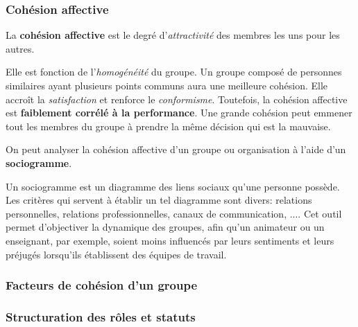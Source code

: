 \documentclass[12pt]{article}
\begin{document}
				
		\subsubsection{Cohésion affective}
		
		La \textbf{cohésion affective} est le degré d'\textit{attractivité} des membres les uns pour les autres.	\newline
		
		Elle est fonction de l'\textit{homogénéité} du groupe. Un groupe composé de personnes similaires ayant plusieurs points communs aura une meilleure cohésion. Elle accroît la \textit{satisfaction} et renforce le \textit{conformisme}. Toutefois, la cohésion affective est \textbf{faiblement corrélé à la performance}. Une grande cohésion peut emmener tout les membres du groupe à prendre la même décision qui est la mauvaise. \newline
		
		On peut analyser la cohésion affective d'un groupe ou organisation à l'aide d'un \textbf{sociogramme}. \newline 
		
		Un sociogramme est un diagramme des liens sociaux qu'une personne possède. Les critères qui servent à établir un tel diagramme sont divers: relations personnelles, relations professionnelles, canaux de communication, .... Cet outil permet d'objectiver la dynamique des groupes, afin qu'un animateur ou un enseignant, par exemple, soient moins influencés par leurs sentiments et leurs préjugés lorsqu'ils établissent des équipes de travail.\newline
		
		
		\subsubsection{Facteurs de cohésion d’un groupe}
		
		
				
		\subsubsection{Structuration des rôles et statuts}
		
\end{document}
